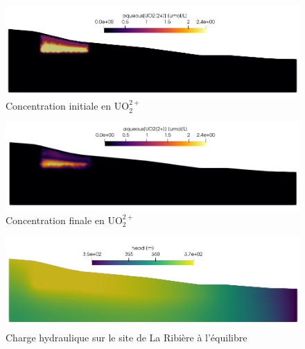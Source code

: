 \documentclass{article}
\begin{document}
\begin{figure}[H]
    \centering
    \includegraphics[width=\linewidth]{LJ-UO22P-initial.png}
    \caption{Concentration initiale en UO$_2^{2+}$}
    \label{fig:uo2P-initial}
\end{figure}
\begin{figure}[H]
    \centering
    \includegraphics[width=\linewidth]{LJ-UO22P-final.PNG}
    \caption{Concentration finale en UO$_2^{2+}$}
    \label{fig:uo2P-final}
\end{figure}

\begin{figure}[H]
    \centering
    \includegraphics[width=\linewidth]{LJ-charge-hydraulique-finale.PNG}
    \caption{Charge hydraulique sur le site de La Ribière à l'équilibre}
    \label{fig:charge_hydro_finale}
\end{figure}
\end{document}
